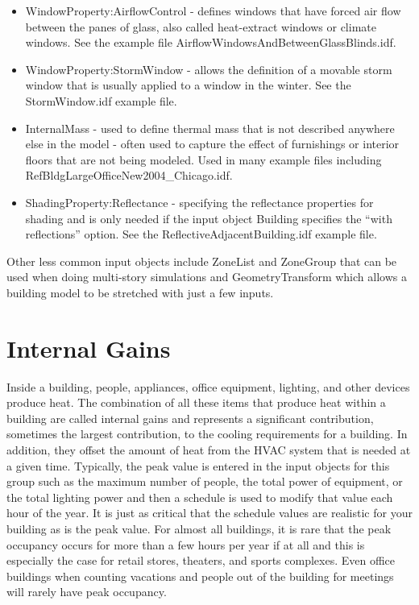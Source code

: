 \begin{itemize}
\item WindowProperty:AirflowControl - defines windows that have forced air
flow between the panes of glass, also called heat-extract windows
or climate windows. See the example file AirflowWindowsAndBetweenGlassBlinds.idf.
\item WindowProperty:StormWindow - allows the definition of a movable storm
window that is usually applied to a window in the winter. See the
StormWindow.idf example file.
\item InternalMass - used to define thermal mass that is not described anywhere
else in the model - often used to capture the effect of furnishings
or interior floors that are not being modeled. Used in many example
files including RefBldgLargeOfficeNew2004\_Chicago.idf.
\item ShadingProperty:Reflectance - specifying the reflectance properties
for shading and is only needed if the input object Building specifies
the ``with reflections'' option. See the ReflectiveAdjacentBuilding.idf
example file.
\end{itemize}
Other less common input objects include ZoneList and ZoneGroup that
can be used when doing multi-story simulations and GeometryTransform
which allows a building model to be stretched with just a few inputs.

\section{Internal Gains }

Inside a building, people, appliances, office equipment, lighting,
and other devices produce heat. The combination of all these items
that produce heat within a building are called internal gains and
represents a significant contribution, sometimes the largest contribution,
to the cooling requirements for a building. In addition, they offset
the amount of heat from the HVAC system that is needed at a given
time. Typically, the peak value is entered in the input objects for
this group such as the maximum number of people, the total power of
equipment, or the total lighting power and then a schedule is used
to modify that value each hour of the year. It is just as critical
that the schedule values are realistic for your building as is the
peak value. For almost all buildings, it is rare that the peak occupancy
occurs for more than a few hours per year if at all and this is especially
the case for retail stores, theaters, and sports complexes. Even office
buildings when counting vacations and people out of the building for
meetings will rarely have peak occupancy.


